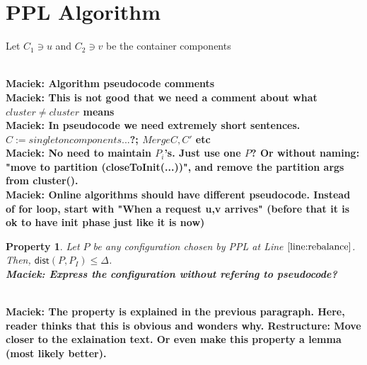 \documentclass[manuscript,screen=true, review, anonymous]{acmart}
\newcommand{\PPL}{\textsf{PPL}\xspace}
\newcommand{\dist}{\textsf{dist}}
\newtheorem{property}{Property}
\DeclarePairedDelimiter\set{\{}{\}}
\newcommand\maciek[1]{\color{brown}\textbf{\\ Maciek: #1}\color{black}}
\begin{document}
\section{PPL Algorithm} \label{alg:PPL}
\begin{algorithm}
	\renewcommand{\algorithmicrequire}{\textbf{Input:}}
	\renewcommand{\algorithmicensure}{\textbf{Output:}}
	\begin{algorithmic}
		\label{line:initcomponents}
		\STATE Let $C_1 \ni u$ and $C_2 \ni v$ be the container components
		 \label{line:mergecomponents}
		\label{line:rebalance} 
		\ENDIF
		\ENDIF
		\ENDFOR
	\end{algorithmic}
	\caption{Perfect Partition Learner (\PPL)}
	\label{alg:ppl}
\end{algorithm}


\maciek{Algorithm pseudocode comments}
\maciek{This is not good that we need a comment about what $cluster \neq cluster$ means}
\maciek{In pseudocode we need extremely short sentences. $C := singleton components ... $?; $Merge C, C'$ etc}
\maciek{No need to maintain $P_i$'s. Just use one $P$? Or without naming: "move to partition (closeToInit(...))", and remove the partition args from cluster().}
\maciek{Online algorithms should have different pseudocode. Instead of for loop, start with "When a request u,v arrives" (before that it is ok to have init phase just like it is now)}

\begin{property} \label{prop:dist<OPT}
	Let $P$ be any configuration chosen by \PPL at Line $\ref{line:rebalance}$.
	Then, $\dist(P,P_I) \leq \Delta$.
	\maciek{Express the configuration without refering to pseudocode?}
\end{property}
\maciek{The property is explained in the previous paragraph. Here, reader thinks that this is obvious and wonders why. Restructure: Move closer to the exlaination text. Or even make this property a lemma (most likely better).}
\end{document}

